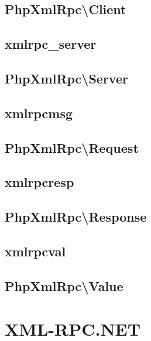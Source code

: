 \section{PhpXmlRpc\textbackslash Client}


\section{xmlrpc\_server}



\section{PhpXmlRpc\textbackslash Server}


\section{xmlrpcmsg}



\section{PhpXmlRpc\textbackslash Request}


\section{xmlrpcresp}


\section{PhpXmlRpc\textbackslash Response}



\section{xmlrpcval}



\section{PhpXmlRpc\textbackslash Value}



\chapter{XML-RPC.NET}




